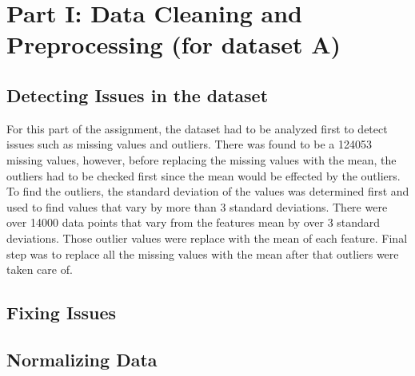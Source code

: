\section{Part I: Data Cleaning and Preprocessing (for dataset A)}
\subsection{Detecting Issues in the dataset}
For this part of the assignment, the dataset had to be analyzed first to detect issues such as missing values and outliers. There was found to be a 124053 missing values, however, before replacing the missing values with the mean, the outliers had to be checked first since the mean would be effected by the outliers. To find the outliers, the standard deviation of the values was determined first and used to find values that vary by more than 3 standard deviations. There were over 14000 data points that vary from the features mean by over 3 standard deviations. Those outlier values were replace with the mean of each feature. Final step was to replace all the missing values with the mean after that outliers were taken care of. 


\subsection{Fixing Issues}




\subsection{Normalizing Data}
